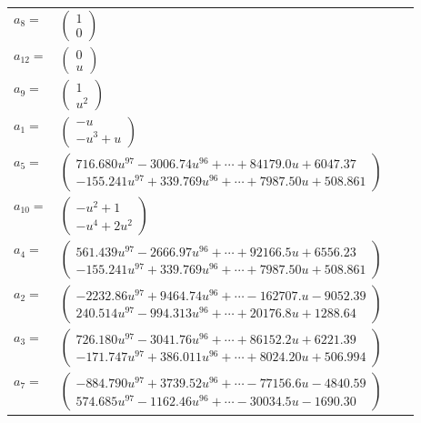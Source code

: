 \documentclass[1p]{elsarticle_modified}
\theoremstyle{definition}
\begin{document}
\begin{tabular}{m{7pt} m{180pt} m{7pt} m{180pt} }
\flushright $a_{8}=$&$\begin{pmatrix}1\\0\end{pmatrix}$ \\
\flushright $a_{12}=$&$\begin{pmatrix}0\\u\end{pmatrix}$ \\
\flushright $a_{9}=$&$\begin{pmatrix}1\\u^2\end{pmatrix}$ \\
\flushright $a_{1}=$&$\begin{pmatrix}- u\\- u^3+u\end{pmatrix}$ \\
\flushright $a_{5}=$&$\begin{pmatrix}716.680 u^{97}-3006.74 u^{96}+\cdots+84179.0 u+6047.37\\-155.241 u^{97}+339.769 u^{96}+\cdots+7987.50 u+508.861\end{pmatrix}$ \\
\flushright $a_{10}=$&$\begin{pmatrix}- u^2+1\\- u^4+2 u^2\end{pmatrix}$ \\
\flushright $a_{4}=$&$\begin{pmatrix}561.439 u^{97}-2666.97 u^{96}+\cdots+92166.5 u+6556.23\\-155.241 u^{97}+339.769 u^{96}+\cdots+7987.50 u+508.861\end{pmatrix}$ \\
\flushright $a_{2}=$&$\begin{pmatrix}-2232.86 u^{97}+9464.74 u^{96}+\cdots-162707. u-9052.39\\240.514 u^{97}-994.313 u^{96}+\cdots+20176.8 u+1288.64\end{pmatrix}$ \\
\flushright $a_{3}=$&$\begin{pmatrix}726.180 u^{97}-3041.76 u^{96}+\cdots+86152.2 u+6221.39\\-171.747 u^{97}+386.011 u^{96}+\cdots+8024.20 u+506.994\end{pmatrix}$ \\
\flushright $a_{7}=$&$\begin{pmatrix}-884.790 u^{97}+3739.52 u^{96}+\cdots-77156.6 u-4840.59\\574.685 u^{97}-1162.46 u^{96}+\cdots-30034.5 u-1690.30\end{pmatrix}$ \\

\end{tabular}
\end{document}
